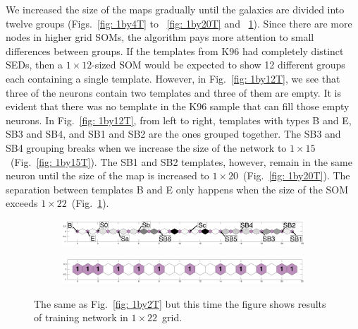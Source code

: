             We increased the size of the maps gradually until the galaxies are divided into twelve groups (Figs.~\ref{fig: 1by4T} to ~\ref{fig: 1by20T} and ~\ref{fig: 1by22T}).
            Since there are more nodes in higher grid SOMs, the  algorithm %
            pays more attention to small differences between groups.
            If the templates from K96 had completely distinct SEDs, then a $1\times12$-sized SOM would be expected to show 12 different groups each containing a single template.
            However, in Fig.~\ref{fig: 1by12T}, we see that three of the neurons contain two templates and three of them are empty.
            It is evident that there was no template in the K96 sample that can fill those empty neurons.
            In Fig.~\ref{fig: 1by12T}, from left to right, templates with types B and E, SB3 and SB4, and SB1 and SB2 are the ones grouped together. 
            The SB3 and SB4 grouping breaks when we increase the size of the network to $1\times15$~(Fig.~\ref{fig: 1by15T}).
            The SB1 and SB2 templates, however, remain in the same neuron until the size of the map is increased to $1\times20$~(Fig.~\ref{fig: 1by20T}).
            The separation between templates B and E only happens when the size of the SOM exceeds $1\times22$~(Fig.~\ref{fig: 1by22T}).
        \begin{figure}
            \begin{subfigure}[b]{\textwidth}
                \centering
                \includegraphics[width=\textwidth]{images0.01/1d/dist_1_by_22.png}
            \end{subfigure}
            \hfill
            \begin{subfigure}[b]{\textwidth}
                \includegraphics[width=\textwidth]{images0.01/1d/hit_t_1_by_22.png}
            \end{subfigure}
            \caption{The same as Fig.~\ref{fig: 1by2T} but this time the figure shows results of training network in $1\times22$~grid.}
            \label{fig: 1by22T}
        \end{figure} %
    
